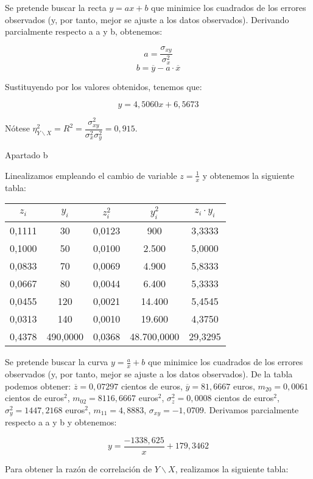 \documentclass{article}
\begin{document}
Se pretende buscar la recta $y = ax + b$ que minimice los cuadrados de los errores observados (y, por tanto, mejor se ajuste a los datos observados). Derivando parcialmente respecto a a y b, obtenemos: 

$$a = \frac{\sigma_{xy}}{\sigma_x^2}$$
$$b = \overline{y} - a·\overline{x}$$

Sustituyendo por los valores obtenidos, tenemos que:

$$y=4,5060x+6,5673$$

Nótese $\eta_{Y\backslash X}^2 = R^2 = \dfrac{\sigma_{xy}^2}{\sigma_x^2\sigma_y^2}=0,915$.

Apartado b

Linealizamos empleando el cambio de variable $z=\frac{1}{x}$ y obtenemos la siguiente tabla: 

\begin{center}
	\begin{tabular}{ c|c|c|c|c }
	
	$z_i$ & $y_i$ & $z_i^2$ & $y_i^2$ & $z_i·y_i$ \\ \hline
	0,1111 & 30 & 0,0123 & 900 & 3,3333 \\ 
	0,1000 & 50 & 0,0100 & 2.500 & 5,0000 \\ 
	0,0833 & 70 & 0,0069 & 4.900 & 5,8333 \\ 
	0,0667 & 80 & 0,0044 & 6.400 & 5,3333 \\ 
	0,0455 & 120 & 0,0021 & 14.400 & 5,4545 \\ 
	0,0313 & 140 & 0,0010 & 19.600 & 4,3750 \\ \hline
	0,4378 & 490,0000 & 0,0368 & 48.700,0000 & 29,3295 \\ 
\end{tabular}
\end{center}

Se pretende buscar la curva $y = \frac{a}{x} + b$ que minimice los cuadrados de los errores observados (y, por tanto, mejor se ajuste a los datos observados). De la tabla podemos obtener: $\overline{z}= 0,07297$ cientos de euros, $\overline{y}= 81,6667$ euros, $m_{20} = 0,0061$ cientos de euros$^2$, $m_{02} = 8116,6667$ euros$^2$, $\sigma_z^2= 0,0008$ cientos de euros$^2$, $\sigma_y^2= 1447,2168$ euros$^2$, $m_{11} = 4,8883$, $\sigma_{xy} =  -1,0709$. Derivamos parcialmente respecto a a y b y obtenemos:

$$y=\frac{-1338,625}{x}+179,3462$$

Para obtener la razón de correlación de $Y\backslash X$, realizamos la siguiente tabla:
\end{document}
